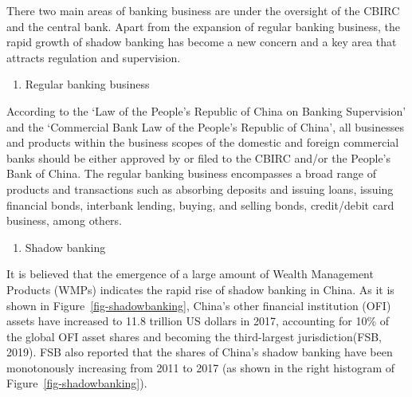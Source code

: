 \documentclass[
  12pt,
  a4paper,
]{scrreprt}
\providecommand{\tightlist}{%
  \setlength{\itemsep}{0pt}\setlength{\parskip}{0pt}}\usepackage{longtable,booktabs,array}
\begin{document}
{{{{There two main areas of banking business are under the oversight of the
CBIRC and the central bank. Apart from the expansion of regular banking
business, the rapid growth of shadow banking has become a new concern
and a key area that attracts regulation and supervision.

\begin{enumerate}
\def\labelenumi{\alph{enumi})}
\tightlist
\item
  Regular banking business
\end{enumerate}

According to the `Law of the People's Republic of China on Banking
Supervision' and the `Commercial Bank Law of the People's Republic of
China', all businesses and products within the business scopes of the
domestic and foreign commercial banks should be either approved by or
filed to the CBIRC and/or the People's Bank of China. The regular
banking business encompasses a broad range of products and transactions
such as absorbing deposits and issuing loans, issuing financial bonds,
interbank lending, buying, and selling bonds, credit/debit card
business, among others.

\begin{enumerate}
\def\labelenumi{\alph{enumi})}
\setcounter{enumi}{1}
\tightlist
\item
  Shadow banking
\end{enumerate}

It is believed that the emergence of a large amount of Wealth Management
Products (WMPs) indicates the rapid rise of shadow banking in China. As
it is shown in Figure~\ref{fig-shadowbanking}, China's other financial
institution (OFI) assets have increased to 11.8 trillion US dollars in
2017, accounting for 10\% of the global OFI asset shares and becoming
the third-largest jurisdiction(FSB, 2019). FSB also reported that the
shares of China's shadow banking have been monotonously increasing from
2011 to 2017 (as shown in the right histogram of
Figure~\ref{fig-shadowbanking}).

\begin{figure}

\end{figure}}}}}
\end{document}
